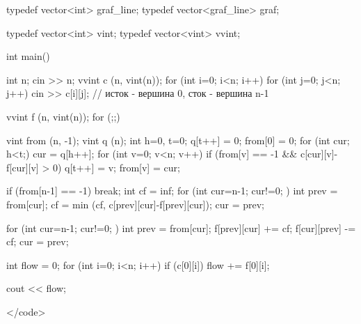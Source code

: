 typedef vector<int> graf_line;
typedef vector<graf_line> graf;

typedef vector<int> vint;
typedef vector<vint> vvint;


int main()
{
	int n;
	cin >> n;
	vvint c (n, vint(n));
	for (int i=0; i<n; i++)
		for (int j=0; j<n; j++)
			cin >> c[i][j];
	// исток - вершина 0, сток - вершина n-1

	vvint f (n, vint(n));
	for (;;)
	{
		
		vint from (n, -1);
		vint q (n);
		int h=0, t=0;
		q[t++] = 0;
		from[0] = 0;
		for (int cur; h<t;)
		{
			cur = q[h++];
			for (int v=0; v<n; v++)
				if (from[v] == -1 &&
					c[cur][v]-f[cur][v] > 0)
				{
					q[t++] = v;
					from[v] = cur;
				}
		}

		if (from[n-1] == -1)
			break;
		int cf = inf;
		for (int cur=n-1; cur!=0; )
		{
			int prev = from[cur];
			cf = min (cf, c[prev][cur]-f[prev][cur]);
			cur = prev;
		}

		for (int cur=n-1; cur!=0; )
		{
			int prev = from[cur];
			f[prev][cur] += cf;
			f[cur][prev] -= cf;
			cur = prev;
		}

	}

	int flow = 0;
	for (int i=0; i<n; i++)
		if (c[0][i])
			flow += f[0][i];

	cout << flow;

}</code>